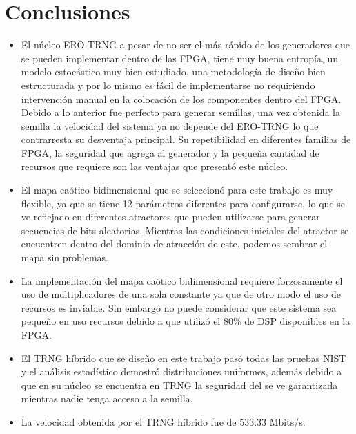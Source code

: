 \chapter{Conclusiones}

    \begin{itemize}
        \item El núcleo ERO-TRNG a pesar de no ser el más rápido de los generadores que se pueden implementar dentro de las FPGA, tiene muy buena entropía, un modelo estocástico muy bien estudiado, una metodología de diseño bien estructurada y por lo mismo es fácil de implementarse no requiriendo intervención manual en la colocación de los componentes dentro del FPGA. Debido a lo anterior fue perfecto para generar semillas, una vez obtenida la semilla la velocidad del sistema ya no depende del ERO-TRNG lo que contrarresta su desventaja principal. Su repetibilidad en diferentes familias de FPGA, la seguridad que agrega al generador y la pequeña cantidad de recursos que requiere son las ventajas que presentó este núcleo.

        \item El mapa caótico bidimensional que se seleccionó para este trabajo es muy flexible, ya que se tiene 12 parámetros diferentes para configurarse, lo que se ve reflejado en diferentes atractores que pueden utilizarse para generar secuencias de bits aleatorias. Mientras las condiciones iniciales del atractor se encuentren dentro del dominio de atracción de este, podemos sembrar el mapa sin problemas. 

        \item La implementación del mapa caótico bidimensional requiere forzosamente el uso de multiplicadores de una sola constante ya que de otro modo el uso de recursos es inviable. Sin embargo no puede considerar que este sistema sea pequeño en uso recursos debido a que utilizó el 80\% de DSP disponibles en la FPGA.

        \item El TRNG híbrido que se diseño en este trabajo pasó todas las pruebas NIST y el análisis estadístico demostró distribuciones uniformes, además debido a que en su núcleo se encuentra en TRNG la seguridad del se ve garantizada mientras nadie tenga acceso a la semilla.

        \item La velocidad obtenida por el TRNG híbrido fue de 533.33 Mbits/s.

    \end{itemize}
    
